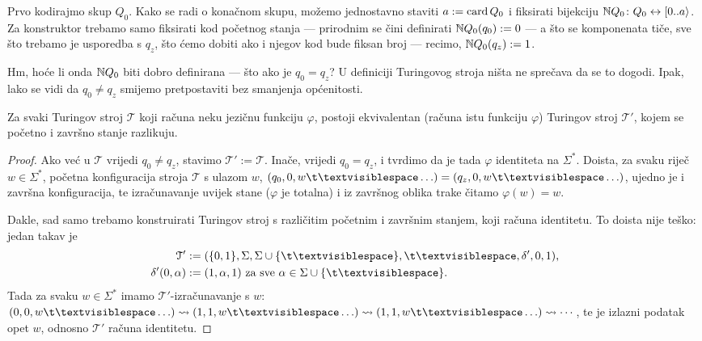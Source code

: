 
Prvo kodirajmo skup $Q_0$. Kako se radi o konačnom skupu, možemo jednostavno staviti $a:=\operatorname{card} Q_0$ i fiksirati bijekciju ${\mathbb N} Q_0\colon Q_0\leftrightarrow[0..a\rangle$. Za konstruktor trebamo samo fiksirati kod početnog stanja --- prirodnim se čini definirati ${\mathbb N} Q_0(q_0):=0$ --- a što se komponenata tiče, sve što trebamo je usporedba s $q_z$, što ćemo dobiti ako i njegov kod bude fiksan broj --- recimo, ${\mathbb N} Q_0(q_z):=1$.

Hm, hoće li onda ${\mathbb N} Q_0$ biti dobro definirana --- što ako je $q_0=q_z$? U definiciji Turingovog stroja ništa ne sprečava da se to dogodi. Ipak, lako se vidi da $q_0\not=q_z$ smijemo pretpostaviti bez smanjenja općenitosti.

\begin{lema}[{name=[možemo pretpostaviti $q_0\not=q_z$]}]\label{lm:bsomp-q0neqz}
Za svaki Turingov stroj $\mathcal T$ koji računa neku jezičnu funkciju $\varphi$, postoji ekvivalentan (računa istu funkciju $\varphi$) Turingov stroj $\mathcal T'$, kojem se početno i završno stanje razlikuju.
\end{lema}
\begin{proof}
Ako već u $\mathcal T$ vrijedi $q_0\not=q_z$, stavimo $\mathcal T':=\mathcal T$. Inače, vrijedi $q_0=q_z$, i tvrdimo da je tada $\varphi$ identiteta na $\Sigma^*$. Doista, za svaku riječ $w\in\Sigma^*$, početna konfiguracija stroja $\mathcal T$ s ulazom $w$, $(q_0,0,w\bl\ldots)=(q_z,0,w\bl\ldots)$, ujedno je i završna konfiguracija, te izračunavanje uvijek stane ($\varphi$ je totalna) i iz završnog oblika trake čitamo $\varphi(w)=w$.

Dakle, sad samo trebamo konstruirati Turingov stroj s različitim početnim i za\-vrš\-nim stanjem, koji računa identitetu. To doista nije teško: jedan takav je
\begin{align}
    \mathcal T'&:=(\{0,1\},\Sigma,\Sigma\cup\{\bl\},\bl,\delta',0,1)\text,\\
    \delta'(0,\alpha)&:=(1,\alpha,1)\text{ za sve $\alpha\in\Sigma\cup\{\bl\}$.}
\end{align}
Tada za svaku $w\in\Sigma^*$ imamo $\mathcal T'$-izračunavanje s $w$: $(0,0,w\bl\ldots)\leadsto(1,1,w\bl\ldots)\leadsto(1,1,w\bl\ldots)\leadsto\cdots$,
te je izlazni podatak opet $w$, odnosno $\mathcal T'$ računa identitetu.
\end{proof}

